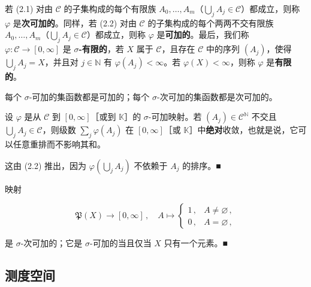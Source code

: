若 (2.1) 对由 $ \mathcal{C} $ 的子集构成的每个有限族 $ A_0, \ldots, A_m $（$ \bigcup_j A_j \in \mathcal{C} $）都成立，则称 $ \varphi $ 是\textbf{次可加的}。同样，若 (2.2) 对由 $ \mathcal{C} $ 的子集构成的每个两两不交有限族 $ A_0, \ldots, A_m $（$ \bigcup_j A_j \in \mathcal{C} $）都成立，则称 $ \varphi $ 是\textbf{可加的}。最后，我们称 $ \varphi\colon \mathcal{C} \to [0,\infty] $ 是 \textbf{$ \sigma $-有限的}，若 $ X $ 属于 $ \mathcal{C} $，且存在 $ \mathcal{C} $ 中的序列 $ (A_j) $，使得 $ \bigcup_j A_j = X $，并且对 $ j \in \mathbb{N} $ 有 $ \varphi(A_j) < \infty $。若 $ \varphi(X) < \infty $，则称 $ \varphi $ 是\textbf{有限的}。

\begin{remark}

\begin{items}
\item

每个 $ \sigma $-可加的集函数都是可加的；每个 $ \sigma $-次可加的集函数都是次可加的。

\item

设 $ \varphi $ 是从 $ \mathcal{C} $ 到 $ [0,\infty] $［或到 $ \mathbb{K} $］的 $ \sigma $-可加映射。若 $ (A_j) \in \mathcal{C}^{\mathbb{N}} $ 不交且 $ \bigcup_j A_j \in \mathcal{C} $，则级数 $ \sum_j \varphi(A_j) $ 在 $ [0,\infty] $［或 $ \mathbb{K} $］中\textbf{绝对}收敛，也就是说，它可以任意重排而不影响其和。

\proofhead
这由 (2.2) 推出，因为 $ \varphi\left(\bigcup_j A_j\right) $ 不依赖于 $ A_j $ 的排序。\nobreak\hspace{0.35em}■
\item

映射

\begin{equation*}
\mathfrak{P}(X) \to [0,\infty]\,,\quad A \mapsto \begin{cases} 1\,, & A \ne \varnothing\,, \\ 0\,, & A = \varnothing\,, \end{cases}
\end{equation*}

是 $ \sigma $-次可加的；它是 $ \sigma $-可加的当且仅当 $ X $ 只有一个元素。\nobreak\hspace{0.35em}■

\end{items}

\end{remark}

\subsection*{测度空间}

